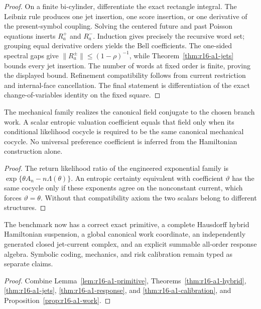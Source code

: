 \begin{proof}
On a finite bi-cylinder, differentiate the exact rectangle integral.  The
Leibniz rule produces one jet insertion, one score insertion, or one derivative
of the present-symbol coupling.  Solving the centered future and past Poisson
equations inserts \(R_a^+\) and \(R_a^-\).  Induction gives precisely the
recursive word set; grouping equal derivative orders yields the Bell
coefficients.  The one-sided spectral gaps give
\(\|R_a^\pm\|\le(1-\rho)^{-1}\), while
Theorem~\ref{thm:r16-a1-jets} bounds every jet insertion.  The number of words
at fixed order is finite, proving the displayed bound.  Refinement
compatibility follows from current restriction and internal-face cancellation.
The final statement is differentiation of the exact change-of-variables
identity on the fixed square.
\end{proof}

\begin{theorem}
\label{thm:r16-a1-calibration}
The mechanical family realizes the canonical field conjugate to the chosen
branch work.  A scalar entropic valuation coefficient equals that field only
when its conditional likelihood cocycle is required to be the same canonical
mechanical cocycle.  No universal preference coefficient is inferred from the
Hamiltonian construction alone.
\end{theorem}

\begin{proof}
The return likelihood ratio of the engineered exponential family is
\(\exp\{\theta A_n-n\Lambda(\theta)\}\).  An entropic certainty equivalent
with coefficient \(\vartheta\) has the same cocycle only if these exponents
agree on the nonconstant current, which forces \(\vartheta=\theta\).  Without
that compatibility axiom the two scalars belong to different structures.
\end{proof}

\begin{theorem}
\label{thm:r16-a1-main}
The benchmark now has a correct exact primitive, a complete Hausdorff hybrid
Hamiltonian suspension, a global canonical work coordinate, an independently
generated closed jet-current complex, and an explicit summable all-order
response algebra.  Symbolic coding, mechanics, and risk calibration remain
typed as separate claims.
\end{theorem}

\begin{proof}
Combine Lemma~\ref{lem:r16-a1-primitive},
Theorems~\ref{thm:r16-a1-hybrid}, \ref{thm:r16-a1-jets},
\ref{thm:r16-a1-response}, and \ref{thm:r16-a1-calibration}, and
Proposition~\ref{prop:r16-a1-work}.
\end{proof}
